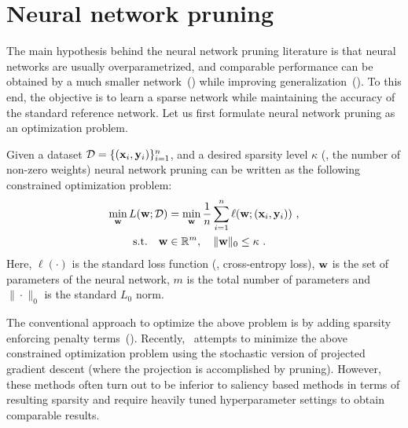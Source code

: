 \section{Neural network pruning}\label{sec:prelim}
The main hypothesis behind the neural network pruning literature is that neural networks are usually overparametrized, and comparable performance can be obtained by a much smaller network~(\cite{reed1993pruning}) while improving generalization~(\cite{arora2018stronger}).
To this end, the objective is to learn a sparse network while maintaining the accuracy of the standard reference network.
Let us first formulate neural network pruning as an optimization problem. %

Given a dataset ${\mathcal{D}} = \{({\mathbf{x}}_i, {\mathbf{y}}_i)\}_{i=1}^n$, and a desired sparsity level $\kappa$ (\ie, the number of non-zero weights) neural network pruning can be written as the following constrained optimization problem:
\begin{align}\label{eq:nn}
\min_{{\mathbf{w}}} L({\mathbf{w}};{\mathcal{D}}) &= \min_{{\mathbf{w}}} \frac{1}{n} \sum_{i=1}^n \ell({\mathbf{w}}; ({\mathbf{x}}_i, {\mathbf{y}}_i))\
,\\\nonumber 
\text{s.t.}\quad{\mathbf{w}} &\in \mathbb{R}^m,\quad \|{\mathbf{w}}\|_0 \le \kappa\ .
\end{align}
Here, $\ell(\cdot)$ is the standard loss function (\eg, cross-entropy loss), ${\mathbf{w}}$ is the set of parameters of the neural network, $m$ is the total number of parameters and $\|\cdot\|_0$ is the standard $L_0$ norm.
%

The conventional approach to optimize the above problem is by adding sparsity enforcing penalty terms~(\cite{chauvin1989back, weigend1991generalization, ishikawa1996structural}).
Recently,~\cite{Carreira-Perpiñán_2018_CVPR} attempts to minimize the above constrained optimization problem using the stochastic version of projected gradient descent (where the projection is accomplished by pruning).
However, these methods often turn out to be inferior to saliency based methods in terms of resulting sparsity and require heavily tuned hyperparameter settings to obtain comparable results.

